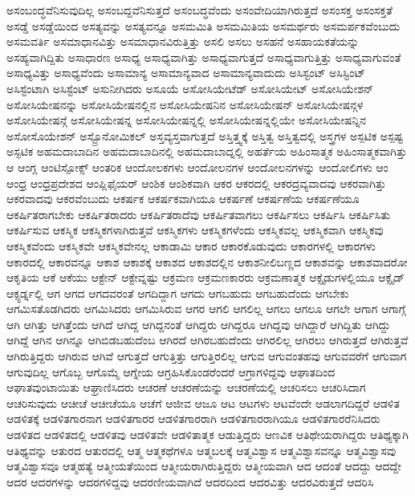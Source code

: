 {ಅಸಂಬಂದ್ಧವೆನಿಸುವುದಿಲ್ಲ
ಅಸಂಬದ್ದವೆನಿಸುತ್ತದೆ
ಅಸಂಬದ್ಧವೆಂದು
ಅಸಂವೇದಿಯಾಗಿರುತ್ತದೆ
ಅಸಂಸಕ್ತ
ಅಸಂಸಕ್ತತೆ
ಅಸಡ್ಡೆ
ಅಸಡ್ಡೆಯಿಂದ
ಅಸತ್ಯವನ್ನು
ಅಸತ್ಯವನ್ನೂ
ಅಸಮಮಿತಿ
ಅಸಮಮಿತಿಯ
ಅಸಮರ್ಥರು
ಅಸಮರ್ಪಕವೆಂಬುದು
ಅಸಮವರ್ತಿ
ಅಸಮಾಧಾನವಿತ್ತು
ಅಸಮಾಧಾನವಿರುತ್ತಿತ್ತು
ಅಸಲಿ
ಅಸಲು
ಅಸಹನೆ
ಅಸಹಾಯಕತೆಯನ್ನು
ಅಸಹ್ಯವಾಗಿದ್ದಿತು
ಅಸಾಧಾರಣ
ಅಸಾಧ್ಯ
ಅಸಾಧ್ಯವಾಗಿತ್ತು
ಅಸಾಧ್ಯವಾಗುತ್ತದೆ
ಅಸಾಧ್ಯವಾಗುತ್ತಿತ್ತು
ಅಸಾಧ್ಯವಾಗುವಂತೆ
ಅಸಾಧ್ಯವಿತ್ತು
ಅಸಾಧ್ಯವೆಂದು
ಅಸಾಮಾನ್ಯ
ಅಸಾಮಾನ್ಯವಾದ
ಅಸಾಮಾನ್ಯವಾದುದು
ಅಸಿಸ್ಟಂಟ್
ಅಸಿಸ್ಟಿಂಟ್
ಅಸಿಸ್ಟೆಂಟಾಗಿ
ಅಸಿಸ್ಟೆಂಟ್
ಅಸುನೀಗಿದರು
ಅಸೂಯೆ
ಅಸೋಸಿಯೇಟೆಡ್
ಅಸೋಸಿಯೇಟ್
ಅಸೋಸಿಯೇಶನ್
ಅಸೋಸಿಯೇಷನನ್ನು
ಅಸೋಸಿಯೇಷನಲ್ಲಿನ
ಅಸೋಸಿಯೇಷನಿನ
ಅಸೋಸಿಯೇಷನ್
ಅಸೋಸಿಯೇಷನ್ಗಳ
ಅಸೋಸಿಯೇಷನ್ಗೆ
ಅಸೋಸಿಯೇಷನ್ನ
ಅಸೋಸಿಯೇಷನ್ನಲ್ಲಿ
ಅಸೋಸಿಯೇಷನ್ನಲ್ಲಿಯೇ
ಅಸೋಸಿಯೇಷನ್ನಿನ
ಅಸೋಸೊಯೇಶನ್
ಅಸ್ಟ್ರೊನೋಮಿಕಲ್
ಅಸ್ತವ್ಯಸ್ತವಾಗುತ್ತದೆ
ಅಸ್ತಿತ್ತ್ವಕ್ಕೆ
ಅಸ್ತಿತ್ವ
ಅಸ್ತಿತ್ವದಲ್ಲಿ
ಅಸ್ತ್ರಗಳ
ಅಸ್ಪಟಿಕ
ಅಸ್ಪಷ್ಟ
ಅಸ್ಫಟಿಕ
ಅಹಮದಾಬಾದಿನ
ಅಹಮದಾಬಾದಿನಲ್ಲಿ
ಅಹಮದಾಬಾದ್ನಲ್ಲಿ
ಅಹರ್ತೆಯ
ಅಹಿಂಸಾತ್ಮಕ
ಅಹಿಂಸಾತ್ಮಕವಾಗಿತ್ತು
ಆ
ಆಂಗ್ಲ
ಆಂಟಿಸ್ಪೋಕ್ಸ್
ಆಂತರಿಕ
ಆಂದೋಲಕಗಳು
ಆಂದೋಲನಗಳ
ಆಂದೋಲನಗಳನ್ನು
ಆಂದೋಲಿಗಳು
ಆಂ
ಆಂಧ್ರ
ಆಂಧ್ರಪ್ರದೇಶದ
ಆಂಪ್ಲಿಫೈಯರ್
ಆಂಶಿಕ
ಆಂಶಿಕವಾಗಿ
ಆಕರ
ಆಕರದಲ್ಲಿ
ಆಕರದ್ರವ್ಯವಾದವು
ಆಕರವಾಗಿತ್ತು
ಆಕರವಾದವು
ಆಕರವೆಂಬುದು
ಆಕರ್ಷಕ
ಆಕರ್ಷಕವಾಗಿಯೂ
ಆಕರ್ಷಣೆ
ಆಕರ್ಷಣೆಯ
ಆಕರ್ಷಣೆಯೂ
ಆಕರ್ಷಿತರಾಗಬೇಕು
ಆಕರ್ಷಿತರಾದರು
ಆಕರ್ಷಿತರಾದೆವು
ಆಕರ್ಷಿತವಾಗಲು
ಆಕರ್ಷಿಸಲು
ಆಕರ್ಷಿಸಿ
ಆಕರ್ಷಿಸಿತು
ಆಕರ್ಷಿಸುವ
ಆಕಸ್ಮಿಕ
ಆಕಸ್ಮಿಕಗಳಾಗಿರುತ್ತವೆ
ಆಕಸ್ಮಿಕಗಳು
ಆಕಸ್ಮಿಕಗಳೆಂದು
ಆಕಸ್ಮಿಕವಲ್ಲ
ಆಕಸ್ಮಿಕವಾಗಿ
ಆಕಸ್ಮಿಕವು
ಆಕಸ್ಮಿಕವೆಂದು
ಆಕಸ್ಮಿಕವೇ
ಆಕಸ್ಮಿಕವೇನಲ್ಲ
ಆಕಾಡಾಮಿ
ಆಕಾರ
ಆಕಾರಕೊಡುವುದು
ಆಕಾರಗಳಲ್ಲಿ
ಆಕಾರಗಳು
ಆಕಾರದಲ್ಲಿ
ಆಕಾರವನ್ನೂ
ಆಕಾಶ
ಆಕಾಶಕ್ಕೆ
ಆಕಾಶದ
ಆಕಾಶದಲ್ಲಿನ
ಆಕಾಶನೀಲಿಬಣ್ಣದ
ಆಕಾಶವನ್ನು
ಆಕಾಶವಾದರೋ
ಆಕೃತಿಯ
ಆಕೆ
ಆಕೆಯು
ಆಕ್ಟೇನ್
ಆಕ್ಟೇವ್ನಷ್ಟು
ಆಕ್ರಮಣ
ಆಕ್ರಮಣಕಾರರು
ಆಕ್ರಮಣಾತ್ಮಕ
ಆಕ್ಸೈಡುಗಳಲ್ಲಿಯೂ
ಆಕ್ಸೈಡ್
ಆಕ್ಸ್ಫರ್ಡ್ನಲ್ಲಿ
ಆಗ
ಆಗದ
ಆಗದವರಂತೆ
ಆಗದಿದ್ದಾಗ
ಆಗದು
ಆಗಬಹುದು
ಆಗಬಹುದೆಂದು
ಆಗಬೇಕು
ಆಗಮಿಸತೊಡಗಿದರು
ಆಗಮಿಸಿದರು
ಆಗಮಿಸಿರುವ
ಆಗರ
ಆಗಲಿ
ಆಗಲಿಲ್ಲ
ಆಗಲು
ಆಗಲೂ
ಆಗಲೇ
ಆಗಾಗ
ಆಗಾಗ್ಗೆ
ಆಗಿ
ಆಗಿತ್ತು
ಆಗಿತ್ತೆಂದು
ಆಗಿದೆ
ಆಗಿದ್ದ
ಆಗಿದ್ದನಂತೆ
ಆಗಿದ್ದರು
ಆಗಿದ್ದರೂ
ಆಗಿದ್ದವು
ಆಗಿದ್ದಾರೆ
ಆಗಿದ್ದಿತು
ಆಗಿದ್ದು
ಆಗಿದ್ದೆ
ಆಗಿನ
ಆಗಿನ್ನೂ
ಆಗಿಬಿಡಬಹುದೆಂಬ
ಆಗಿರದೆ
ಆಗಿರಬಹುದೆಂದು
ಆಗಿರಲಿಲ್ಲ
ಆಗಿರಲು
ಆಗಿರುತ್ತದೆ
ಆಗಿರುತ್ತವೆ
ಆಗಿರುತ್ತಿದ್ದರು
ಆಗಿರುವ
ಆಗಿವೆ
ಆಗುತ್ತದೆ
ಆಗುತ್ತಿತ್ತು
ಆಗುತ್ತಿರಲಿಲ್ಲ
ಆಗುವ
ಆಗುವಂತಹವು
ಆಗುವವರೆಗೆ
ಆಗುವಾಗ
ಆಗುವುದಿಲ್ಲ
ಆಗೊಬ್ಬ
ಆಗೊಮ್ಮೆ
ಆಗ್ನೇಯ
ಆಗ್ರಹಿಸಿಕೊಂಡರೆಂದರೆ
ಆಗ್ರಾಗಳಿದ್ದವು
ಆಘಾತದಿಂದ
ಆಘಾತವುಂಟಾಯಿತು
ಆಘ್ರಾಣಿಸಿದರು
ಆಚರಣೆ
ಆಚರಣೆಯನ್ನು
ಆಚರಣೆಯಲ್ಲಿ
ಆಚರಿಸಲು
ಆಚರಿಸಿದಾಗ
ಆಚರಿಸುವುದು
ಆಚೀಚೆ
ಆಚೀಚೆಯೂ
ಆಚೆಗೆ
ಆಜೀವ
ಆಜೂ
ಆಟ
ಆಟಗಳು
ಆಟವೆಂದೇ
ಆಡಲಾಗದಿದ್ದರೆ
ಆಡಳಿತ
ಆಡಳಿತಕ್ಕೆ
ಆಡಳಿತಗಾರನಾಗ
ಆಡಳಿತಗಾರರ
ಆಡಳಿತಗಾರರಾಗಿ
ಆಡಳಿತಗಾರರಾಗಿಯೂ
ಆಡಳಿತಗಾರರೆನಿಸಿದರು
ಆಡಳಿತದ
ಆಡಳಿತದಲ್ಲಿ
ಆಡಳಿತವು
ಆಡಳಿತವೇ
ಆಡಳಿತಾತ್ಮಕ
ಆಡುತ್ತಿದ್ದರು
ಆಣವಿಕ
ಆತಿಥೇಯರಾಗಿದ್ದರು
ಆತಿಥ್ಯಕ್ಕಾಗಿ
ಆತಿಥ್ಯವನ್ನು
ಆತುರದ
ಆತುರದಲ್ಲಿ
ಆತ್ಮ
ಆತ್ಮಕಥೆಗಳೂ
ಆತ್ಮಬಲಕ್ಕೆ
ಆತ್ಮವಿಶ್ವಾಸ
ಆತ್ಮವಿಶ್ವಾಸವನ್ನೂ
ಆತ್ಮವಿಶ್ವಾಸವು
ಆತ್ಮವಿಶ್ವಾಸವೂ
ಆತ್ಮಹತ್ಯೆ
ಆತ್ಮೀಯತೆಯಿಂದ
ಆತ್ಮೀಯರಾಗಿರುತ್ತಿದ್ದರು
ಆತ್ಮೀಯವಾಗಿ
ಆದ
ಆದಂತೆ
ಆದದ್ದು
ಆದದ್ದೇ
ಆದರ
ಆದರಗಳನ್ನು
ಆದರಗಳಿದ್ದವು
ಆದರಣೀಯವಾಗಿದೆ
ಆದರದಿಂದ
ಆದರವಿತ್ತು
ಆದರವಿರುತ್ತದೆ
ಆದರಿಸಿ
}
